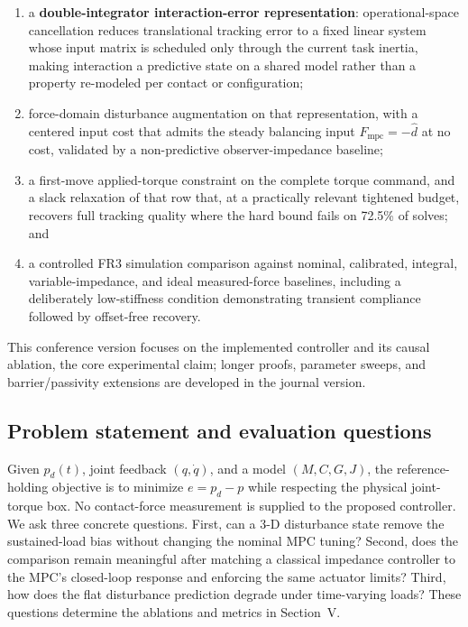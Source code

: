 \documentclass[conference]{IEEEtran}
\newcommand{\Fmpc}{F_{\mathrm{mpc}}}
\newcommand{\dhat}{\hat d}
\begin{document}
\begin{enumerate}[leftmargin=*,itemsep=1pt,topsep=2pt]
\item a \textbf{double-integrator interaction-error representation}:
operational-space cancellation reduces translational tracking error to a
fixed linear system whose input matrix is scheduled only through the
current task inertia, making interaction a predictive state on a shared
model rather than a property re-modeled per contact or configuration;
\item force-domain disturbance augmentation on that representation, with a
centered input cost that admits the steady balancing input $\Fmpc=-\dhat$
at no cost, validated by a non-predictive observer-impedance baseline;
\item a first-move applied-torque constraint on the complete torque
command, and a slack relaxation of that row that, at a practically
relevant tightened budget, recovers full tracking quality where the hard
bound fails on 72.5\% of solves; and
\item a controlled FR3 simulation comparison against nominal, calibrated,
integral, variable-impedance, and ideal measured-force baselines, including
a deliberately low-stiffness condition demonstrating transient compliance
followed by offset-free recovery.
\end{enumerate}

This conference version focuses on the implemented controller and its
causal ablation, the core experimental claim; longer proofs, parameter
sweeps, and barrier/passivity extensions are developed in the journal
version.

\subsection{Problem statement and evaluation questions}

Given $p_d(t)$, joint feedback $(q,\dot q)$, and a model
$(M,C,G,J)$, the reference-holding objective is to minimize
$e=p_d-p$ while respecting the physical joint-torque box. No contact-force
measurement is supplied to the proposed controller. We ask three concrete
questions. First, can a 3-D disturbance state remove the sustained-load bias
without changing the nominal MPC tuning? Second, does the comparison remain
meaningful after matching a classical impedance controller to the MPC's
closed-loop response and enforcing the same actuator limits? Third, how does
the flat disturbance prediction degrade under time-varying loads? These
questions determine the ablations and metrics in Section~V.
\end{document}
